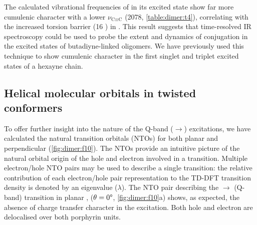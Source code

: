 		The calculated vibrational frequencies of  in its  excited state show far more cumulenic character with a lower $\nu_{\text{C}\equiv{}\text{C}}$ (\SI{2078}{\wn}, \autoref{table:dimer:t4}), correlating with the increased torsion barrier (16 \kjmol) in .\autocite{Winters2007} This result suggests that time-resolved IR spectroscopy could be used to probe the extent and dynamics of conjugation in the excited states of butadiyne-linked oligomers. We have previously used this technique to show cumulenic character in the first singlet and triplet excited states of a hexayne chain.\autocite{Movsisyan2014}
		\FloatBarrier
	\subsection{Helical molecular orbitals in twisted conformers}

		To offer further insight into the nature of the Q-band ($\rightarrow{}$) excitations, we have calculated the natural transition orbitals (NTOs)\autocite{Martin2003} for both planar and perpendicular  (\autoref{fig:dimer:f10}). The NTOs provide an intuitive picture of the natural orbital origin of the hole and electron involved in a transition. Multiple electron/hole NTO pairs may be used to describe a single transition: the relative contribution of each electron/hole pair representation to the TD-DFT transition density is denoted by an eigenvalue ($\lambda$). The NTO pair describing the $\rightarrow{}$ (Q-band) transition in planar , ($\theta = 0\degree$, \autoref{fig:dimer:f10}a) shows, as expected, the absence of charge transfer character in the excitation. Both hole and electron are delocalised over both porphyrin units. 

